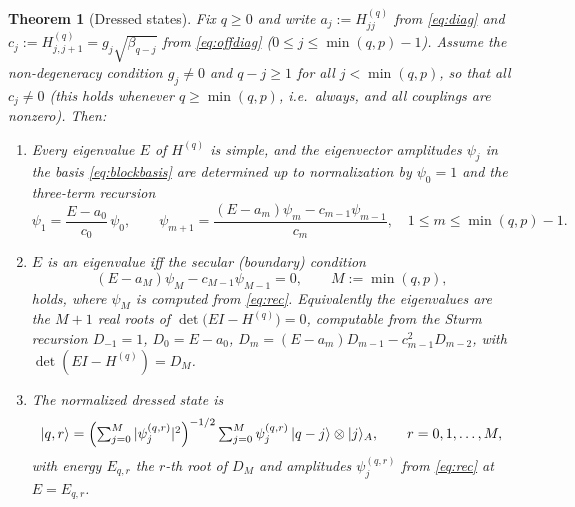 \documentclass[12pt]{article}
\newtheorem{theorem}{Theorem}
\theoremstyle{definition}
\theoremstyle{remark}
\newcommand{\ket}[1]{\lvert #1\rangle}
\begin{document}
\begin{theorem}[Dressed states]\label{thm:eigvec}
Fix $q\ge0$ and write $a_j:=H^{(q)}_{jj}$ from \eqref{eq:diag} and
$c_j:=H^{(q)}_{j,j+1}=g_j\sqrt{\beta_{q-j}}$ from \eqref{eq:offdiag}
($0\le j\le \min(q,p)-1$). Assume the non-degeneracy condition $g_j\neq0$ and
$q-j\ge1$ for all $j<\min(q,p)$, so that all $c_j\neq0$ (this holds whenever
$q\ge \min(q,p)$, i.e.\ always, and all couplings are nonzero). Then:
\begin{enumerate}
\item Every eigenvalue $E$ of $H^{(q)}$ is simple, and the eigenvector amplitudes
$\psi_j$ in the basis \eqref{eq:blockbasis} are determined up to normalization by
$\psi_0=1$ and the three-term recursion
\begin{equation}\label{eq:rec}
\psi_1=\frac{E-a_0}{c_0}\,\psi_0,\qquad
\psi_{m+1}=\frac{(E-a_m)\psi_m-c_{m-1}\psi_{m-1}}{c_m},\quad 1\le m\le \min(q,p)-1.
\end{equation}
\item $E$ is an eigenvalue iff the secular (boundary) condition
\begin{equation}\label{eq:secular}
(E-a_{M})\psi_{M}-c_{M-1}\psi_{M-1}=0,\qquad M:=\min(q,p),
\end{equation}
holds, where $\psi_M$ is computed from \eqref{eq:rec}. Equivalently the eigenvalues
are the $M+1$ real roots of $\det\bigl(E I-H^{(q)}\bigr)=0$, computable from the
Sturm recursion $D_{-1}=1$, $D_0=E-a_0$,
$D_m=(E-a_m)D_{m-1}-c_{m-1}^2 D_{m-2}$, with $\det(EI-H^{(q)})=D_M$.
\item The normalized dressed state is
\begin{equation}\label{eq:dressed}
\ket{q,r}=\Bigl(\textstyle\sum_{j=0}^{M}|\psi_j^{(q,r)}|^2\Bigr)^{-1/2}
\sum_{j=0}^{M}\psi_j^{(q,r)}\,\ket{q-j}\otimes\ket j_A,\qquad r=0,1,\dots,M,
\end{equation}
with energy $E_{q,r}$ the $r$-th root of $D_M$ and amplitudes $\psi^{(q,r)}_j$ from
\eqref{eq:rec} at $E=E_{q,r}$.
\end{enumerate}
\end{theorem}
\end{document}
